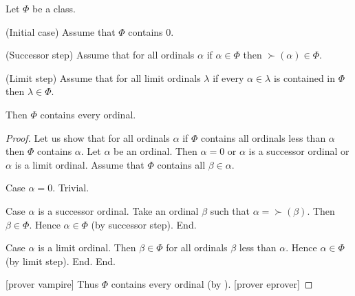 \documentclass[10pt]{article}
\begin{document}
  \begin{forthel}
    \begin{theorem}
      Let $\Phi$ be a class.
      
      (Initial case) Assume that $\Phi$ contains $0$.
      
      (Successor step) Assume that for all ordinals $\alpha$ if $\alpha \in \Phi$ then $\succ(\alpha) \in \Phi$.
      
      (Limit step) Assume that for all limit ordinals $\lambda$ if every $\alpha \in \lambda$ is contained in $\Phi$ then $\lambda \in \Phi$.
      
      Then $\Phi$ contains every ordinal.
    \end{theorem}
    \begin{proof}
      Let us show that for all ordinals $\alpha$ if $\Phi$ contains all ordinals
      less than $\alpha$ then $\Phi$ contains $\alpha$.
        Let $\alpha$ be an ordinal.
        Then $\alpha = 0$ or $\alpha$ is a successor ordinal or $\alpha$ is a
        limit ordinal.
        Assume that $\Phi$ contains all $\beta \in \alpha$.

        Case $\alpha = 0$. Trivial.

        Case $\alpha$ is a successor ordinal.
          Take an ordinal $\beta$ such that $\alpha = \succ(\beta)$.
          Then $\beta \in \Phi$.
          Hence $\alpha \in \Phi$ (by successor step).
        End.

        Case $\alpha$ is a limit ordinal.
          Then $\beta \in \Phi$ for all ordinals $\beta$ less than $\alpha$.
          Hence $\alpha \in \Phi$ (by limit step).
        End.
      End.

      [prover vampire]
      Thus $\Phi$ contains every ordinal (by ).
      [prover eprover]
    \end{proof}
  \end{forthel}
\end{document}
